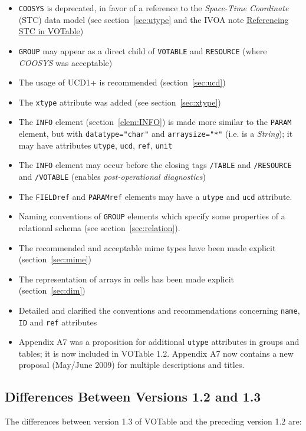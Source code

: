 \documentclass[11pt,a4paper]{ivoa}
\def\Arefs#1{section~\ref{#1}}
\let\fg=\color
\def\attr#1{{\tt{\fg{DarkRed}#1}}}
\def\elem#1{{\tt{\fg{DarkRed}#1}}}
\def\attrval#1#2{{\tt{\fg{DarkRed}#1}="{\fg{DarkPurple}#2}"}}
\begin{document}
\begin{itemize}
\item   \elem{COOSYS} is deprecated, in favor of a reference
        to the {\em Space-Time Coordinate} (STC) data model
        (see \Arefs{sec:utype} and the IVOA note
        \href{http://ivoa.net/documents/Notes/VOTableSTC/}{Referencing STC in VOTable})
\item  \elem{GROUP} may appear as a direct child of
	\elem{VOTABLE} and \elem{RESOURCE} (where {\em COOSYS} was
	acceptable)
\item  The usage of UCD1+ is recommended (\Arefs{sec:ucd})
\item  The \attr{xtype} attribute was added
	(see  \Arefs{sec:xtype})
\item  The {\elem{INFO}} element (\Arefs{elem:INFO}) is made
	more similar
        to the \elem{PARAM} element, but with \attrval{datatype}{char}
        and \attrval{arraysize}{*} (i.e. is a {\em String});
	it may have attributes \attr{utype},  \attr{ucd},
		\attr{ref}, \attr{unit}
\item  The {\elem{INFO}} element may occur before the closing
        tags \elem{/TABLE} and \elem{/RESOURCE}
        and \elem{/VOTABLE}
        (enables {\em post-operational diagnostics})
\item  The {\elem{FIELDref}} and {\elem{PARAMref}} elements may have
	a \attr{utype} and \attr{ucd} attribute.
\item  Naming conventions of \elem{GROUP} elements which specify some
        properties of a relational schema
	(see \Arefs{sec:relation}).
\item   The recommended and acceptable mime types have been made explicit
	(\Arefs{sec:mime})
\item   The representation of arrays in cells has been made explicit
	(\Arefs{sec:dim})
\item   Detailed and clarified the conventions and recommendations concerning
	\attr{name}, \attr{ID} and \attr{ref} attributes
\item	Appendix A7 was a proposition for additional \attr{utype}
        attributes in groups and tables; it is now included in VOTable 1.2.
	Appendix A7 now contains a new proposal
	(May/June 2009) for multiple descriptions and titles.
\end{itemize}

\subsection{Differences Between Versions 1.2 and 1.3}
\label{diff1.2-1.3}
The differences between version 1.3 of VOTable and the preceding
version 1.2 are:
\end{document}
